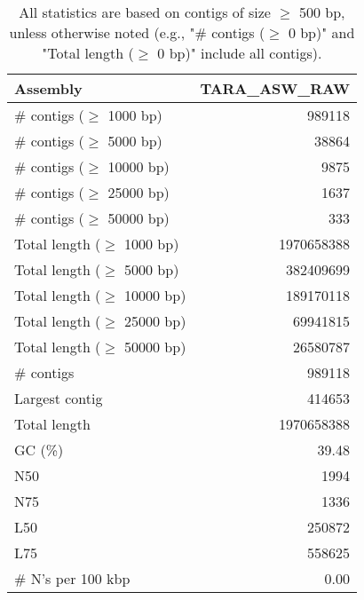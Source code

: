 \documentclass[12pt,a4paper]{article}
\begin{document}
\begin{table}[ht]
\begin{center}
\caption{All statistics are based on contigs of size $\geq$ 500 bp, unless otherwise noted (e.g., "\# contigs ($\geq$ 0 bp)" and "Total length ($\geq$ 0 bp)" include all contigs).}
\begin{tabular}{|l*{1}{|r}|}
\hline
Assembly & TARA\_ASW\_RAW \\ \hline
\# contigs ($\geq$ 1000 bp) & 989118 \\ \hline
\# contigs ($\geq$ 5000 bp) & 38864 \\ \hline
\# contigs ($\geq$ 10000 bp) & 9875 \\ \hline
\# contigs ($\geq$ 25000 bp) & 1637 \\ \hline
\# contigs ($\geq$ 50000 bp) & 333 \\ \hline
Total length ($\geq$ 1000 bp) & 1970658388 \\ \hline
Total length ($\geq$ 5000 bp) & 382409699 \\ \hline
Total length ($\geq$ 10000 bp) & 189170118 \\ \hline
Total length ($\geq$ 25000 bp) & 69941815 \\ \hline
Total length ($\geq$ 50000 bp) & 26580787 \\ \hline
\# contigs & 989118 \\ \hline
Largest contig & 414653 \\ \hline
Total length & 1970658388 \\ \hline
GC (\%) & 39.48 \\ \hline
N50 & 1994 \\ \hline
N75 & 1336 \\ \hline
L50 & 250872 \\ \hline
L75 & 558625 \\ \hline
\# N's per 100 kbp & 0.00 \\ \hline
\end{tabular}
\end{center}
\end{table}
\end{document}

